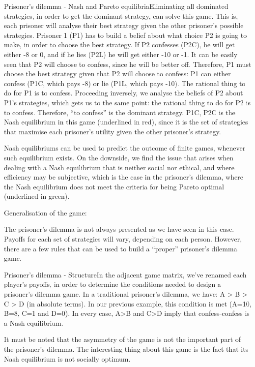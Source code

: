 Prisoner's dilemma - Nash and Pareto equilibriaEliminating all dominated strategies, in order to get the dominant strategy, can solve this game. This is, each prisoner will analyse their best strategy given the other prisoner’s possible strategies. Prisoner 1 (P1) has to build a belief about what choice P2 is going to make, in order to choose the best strategy. If P2 confesses (P2C), he will get either -8 or 0, and if he lies (P2L) he will get either -10 or -1. It can be easily seen that P2 will choose to confess, since he will be better off. Therefore, P1 must choose the best strategy given that P2 will choose to confess: P1 can either confess (P1C, which pays -8) or lie (P1L, which pays -10). The rational thing to do for P1 is to confess. Proceeding inversely, we analyse the beliefs of P2 about P1’s strategies, which gets us to the same point: the rational thing to do for P2 is to confess. Therefore, “to confess” is the dominant strategy. P1C, P2C is the Nash equilibrium in this game (underlined in red), since it is the set of strategies that maximise each prisoner’s utility given the other prisoner’s strategy.

Nash equilibriums can be used to predict the outcome of finite games, whenever such equilibrium exists. On the downside, we find the issue that arises when dealing with a Nash equilibrium that is neither social nor ethical, and where efficiency may be subjective, which is the case in the prisoner’s dilemma, where the Nash equilibrium does not meet the criteria for being Pareto optimal (underlined in green).

 

Generalisation of the game:

The prisoner’s dilemma is not always presented as we have seen in this case. Payoffs for each set of strategies will vary, depending on each person. However, there are a few rules that can be used to build a “proper” prisoner’s dilemma game.

Prisoner's dilemma - StructureIn the adjacent game matrix, we’ve renamed each player’s payoffs, in order to determine the conditions needed to design a prisoner’s dilemma game. In a traditional prisoner’s dilemma, we have: A > B > C > D (in absolute terms). In our previous example, this condition is met (A=10, B=8, C=1 and D=0). In every case, A>B and C>D imply that confess-confess is a Nash equilibrium.

It must be noted that the asymmetry of the game is not the important part of the prisoner’s dilemma. The interesting thing about this game is the fact that its Nash equilibrium is not socially optimum.

